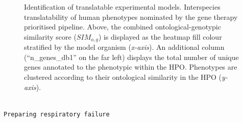 \documentclass[
]{agujournal2019}
\begin{document}
\label{cell-fig-animal-models}
\begin{figure}[H]


\caption{\label{fig-animal-models}Identification of translatable
experimental models. Interspecies translatability of human phenotypes
nominated by the gene therapy prioritised pipeline. Above, the combined
ontological-genotypic similarity score (\(SIM_{o,g}\)) is displayed as
the heatmap fill colour stratified by the model organism
(\emph{x-axis}). An additional column (``n\_genes\_db1'' on the far
left) displays the total number of unique genes annotated to the
phenotypic within the HPO. Phenotypes are clustered according to their
ontological similarity in the HPO (\emph{y-axis}).}

\end{figure}%

\newpage{}

\begin{verbatim}

Preparing respiratory failure 
\end{verbatim}
\end{document}
